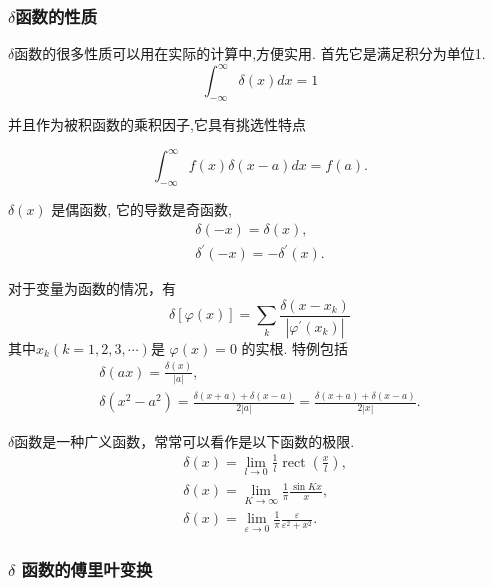 \subsubsection{$\delta$函数的性质}
$\delta$函数的很多性质可以用在实际的计算中,方便实用. 首先它是满足积分为单位1.
$$
\int_{-\infty}^{\infty} \delta(x) d x=1
$$

并且作为被积函数的乘积因子,它具有挑选性特点

$$
\int_{-\infty}^{\infty} f(x) \delta(x-a) d x=f(a).
$$

$\delta(x)$ 是偶函数, 它的导数是奇函数,
$$
\begin{gathered}
\delta(-x)=\delta(x), \\
\delta^{\prime}(-x)=-\delta^{\prime}(x) .
\end{gathered}
$$

对于变量为函数的情况，有
\begin{equation}
    \delta[\varphi(x)]=\sum_k \frac{\delta\left(x-x_k\right)}{\left|\varphi^{\prime}\left(x_k\right)\right|}
\end{equation}
其中$x_k(k=1,2,3, \cdots)$是
$\varphi(x)=0$ 的实根.
特例包括
\begin{equation}
    \begin{gathered}
    \delta(a x)=\frac{\delta(x)}{|a|}, \\
    \delta\left(x^2-a^2\right)=\frac{\delta(x+a)+\delta(x-a)}{2|a|}=\frac{\delta(x+a)+\delta(x-a)}{2|x|} .
    \end{gathered}
\end{equation}

$\delta$函数是一种广义函数，常常可以看作是以下函数的极限.
\begin{equation}
    \begin{aligned}
    & \delta(x)=\lim _{l \rightarrow 0} \frac{1}{l} \operatorname{rect}\left(\frac{x}{l}\right), \\
    & \delta(x)=\lim _{K \rightarrow \infty} \frac{1}{\pi} \frac{\sin K x}{x}, \\
    & \delta(x)=\lim _{\varepsilon \rightarrow 0} \frac{1}{\pi} \frac{\varepsilon}{\varepsilon^2+x^2} .
    \end{aligned}
\end{equation}

\subsubsection{$\delta$ 函数的傅里叶变换}





